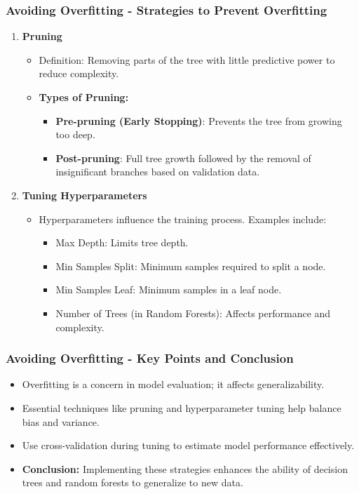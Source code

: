 \documentclass[aspectratio=169]{beamer}
\begin{document}
\begin{frame}[fragile]
    \frametitle{Avoiding Overfitting - Strategies to Prevent Overfitting}
    \begin{enumerate}
        \item \textbf{Pruning}
        \begin{itemize}
            \item Definition: Removing parts of the tree with little predictive power to reduce complexity.
            \item \textbf{Types of Pruning:}
            \begin{itemize}
                \item \textbf{Pre-pruning (Early Stopping)}: Prevents the tree from growing too deep.
                \item \textbf{Post-pruning}: Full tree growth followed by the removal of insignificant branches based on validation data.
            \end{itemize}
        \end{itemize}
        
        \item \textbf{Tuning Hyperparameters}
        \begin{itemize}
            \item Hyperparameters influence the training process. Examples include:
            \begin{itemize}
                \item Max Depth: Limits tree depth.
                \item Min Samples Split: Minimum samples required to split a node.
                \item Min Samples Leaf: Minimum samples in a leaf node.
                \item Number of Trees (in Random Forests): Affects performance and complexity.
            \end{itemize}
        \end{itemize}
    \end{enumerate}
\end{frame}

\begin{frame}[fragile]
    \frametitle{Avoiding Overfitting - Key Points and Conclusion}
    \begin{itemize}
        \item Overfitting is a concern in model evaluation; it affects generalizability.
        \item Essential techniques like pruning and hyperparameter tuning help balance bias and variance.
        \item Use cross-validation during tuning to estimate model performance effectively.
        \item \textbf{Conclusion:} Implementing these strategies enhances the ability of decision trees and random forests to generalize to new data.
    \end{itemize}
\end{frame}
\end{document}
